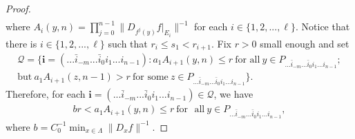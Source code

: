 \documentclass[11pt,a4paper]{amsart}
\theoremstyle{plain}
\theoremstyle{remark}
\def\min{\operatorname{min}}
\begin{document}
\begin{proof}
\begin{align*}
		\end{align*}
		where $A_{i}(y,n)=\prod_{j=0}^{n-1}\|D_{f^{j}(y)}f|_{E_{i}}\|^{-1}$ for each $i\in \{1,2,...,\ell\}$.
		Notice that there is $i\in \{1,2,...,\ell\}$ such that $r_{i}\leq s_{1}<r_{i+1}$. Fix $r>0$ small enough and set
		\begin{align*}
			\mathcal{Q}=\{\mathbf{i}=(...\bar{i}_{-m}...\bar{i}_{0}i_{1}...i_{n-1}):a_{1}A_{i+1}(y,n)\leq r\ \text{for\ all}\ y \in P_{...\bar{i}_{-m}...\bar{i}_{0}i_{1}...i_{n-1}};\\
			\text{but}~a_{1}A_{i+1}(z,n-1)>r~\text{for~some}~z \in P_{...\bar{i}_{-m}...\bar{i}_{0}i_{1}...i_{n-1}}\}.
		\end{align*}
		Therefore, for each $\mathbf{i}=(...\bar{i}_{-m}...\bar{i}_{0}i_{1}...i_{n-1})\in \mathcal{Q}$, we have
		\begin{align*}
			br<a_{1}A_{i+1}(y,n)\leq r ~\text{for ~all}~y\in P_{...\bar{i}_{-m}...\bar{i}_{0}i_{1}...i_{n-1}},
		\end{align*}
		where $b=C_{0}^{-1}\min_{x\in \Lambda}\|D_{x}f\|^{-1}$.
		

\end{proof}
\end{document}
